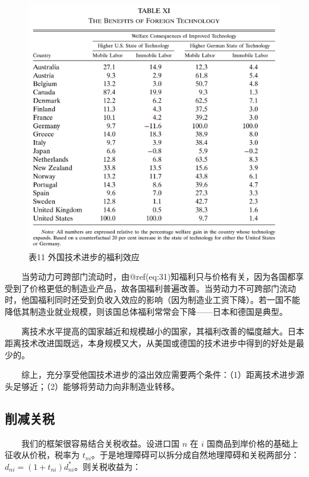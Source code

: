 \documentclass[]{tufte-handout}
\begin{document}
\begin{figure}

{\centering \includegraphics[width=1\linewidth]{Figures/Table11} 

}

\caption[表11 外国技术进步的福利效应]{表11 外国技术进步的福利效应}\label{fig:t11}
\end{figure}

　　当劳动力可跨部门流动时，由@ref(eq:31)知福利只与价格有关，因为各国都享受到了价格更低的制造业产品，故各国福利普遍改善。当劳动力不可跨部门流动时，他国福利同时还受到负收入效应的影响（因为制造业工资下降）。若一国不能降低其制造业就业规模，则该国总体福利常常会下降------日本和德国是典型。

　　离技术水平提高的国家越近和规模越小的国家，其福利改善的幅度越大。日本距离技术改进国既远，本身规模又大，从美国或德国的技术进步中得到的好处是最少的。

　　综上，充分享受他国技术进步的溢出效应需要两个条件：（1）距离技术进步源头足够近；（2）能够将劳动力向非制造业转移。

\hypertarget{ux524aux51cfux5173ux7a0e}{%
\subsection{削减关税}\label{ux524aux51cfux5173ux7a0e}}

　　我们的框架很容易结合关税收益。设进口国 \(n\) 在 \(i\)
国商品到岸价格的基础上征收从价税，税率为
\(t_{ni}\)。于是地理障碍可以拆分成自然地理障碍和关税两部分：\(d_{n i}=\left(1+t_{n i}\right) d_{n i}^{*}\)。则关税收益为：
\end{document}
